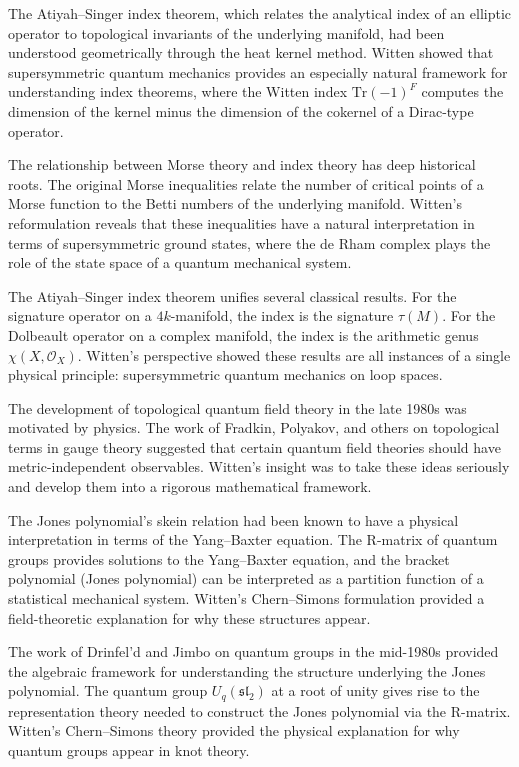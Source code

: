 The Atiyah--Singer index theorem, which relates the analytical index of an elliptic operator to topological invariants of the underlying manifold, had been understood geometrically through the heat kernel method. Witten showed that supersymmetric quantum mechanics provides an especially natural framework for understanding index theorems, where the Witten index $\text{Tr}(-1)^F$ computes the dimension of the kernel minus the dimension of the cokernel of a Dirac-type operator.

The relationship between Morse theory and index theory has deep historical roots. The original Morse inequalities relate the number of critical points of a Morse function to the Betti numbers of the underlying manifold. Witten's reformulation reveals that these inequalities have a natural interpretation in terms of supersymmetric ground states, where the de Rham complex plays the role of the state space of a quantum mechanical system.

The Atiyah--Singer index theorem unifies several classical results. For the signature operator on a $4k$-manifold, the index is the signature $\tau(M)$. For the Dolbeault operator on a complex manifold, the index is the arithmetic genus $\chi(X, \mathcal{O}_X)$. Witten's perspective showed these results are all instances of a single physical principle: supersymmetric quantum mechanics on loop spaces.

The development of topological quantum field theory in the late 1980s was motivated by physics. The work of Fradkin, Polyakov, and others on topological terms in gauge theory suggested that certain quantum field theories should have metric-independent observables. Witten's insight was to take these ideas seriously and develop them into a rigorous mathematical framework.

The Jones polynomial's skein relation had been known to have a physical interpretation in terms of the Yang--Baxter equation. The R-matrix of quantum groups provides solutions to the Yang--Baxter equation, and the bracket polynomial (Jones polynomial) can be interpreted as a partition function of a statistical mechanical system. Witten's Chern--Simons formulation provided a field-theoretic explanation for why these structures appear.

The work of Drinfel'd and Jimbo on quantum groups in the mid-1980s provided the algebraic framework for understanding the structure underlying the Jones polynomial. The quantum group $U_q(\mathfrak{sl}_2)$ at a root of unity gives rise to the representation theory needed to construct the Jones polynomial via the R-matrix. Witten's Chern--Simons theory provided the physical explanation for why quantum groups appear in knot theory.

